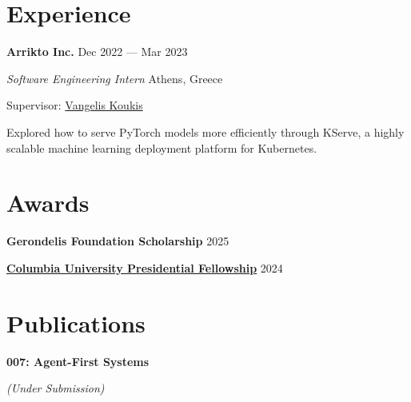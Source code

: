 \documentclass[margin,12pt]{resume}
\newcommand{\cvName}{Nikos Pagonas}
\newcommand{\descriptionVSpace}{\vspace{0.5ex}\xspace}
\newcommand{\subsectionVSpace}{\vspace{3.5ex}\xspace}
\newcommand{\sectionVSpace}{\vspace{1ex}\xspace} %
\newcommand{\sectionVSpaceCorrection}{\vspace{-3.5ex}} %
\newcommand{\header}[1]{\textbf{#1}\xspace}
\newcommand{\authors}[1]{#1\xspace}
\newcommand{\company}[1]{\header{#1}\xspace}
\newcommand{\equalContributionNote}{(*equal contribution)\xspace}
\newcommand{\fellowship}[1]{\header{#1}\xspace}
\newcommand{\interval}[2]{#1 --- #2\xspace}
\newcommand{\me}{\textbf{\cvName}\xspace}
\newcommand{\ordinal}[1]{\textsuperscript{#1}\xspace}
\newcommand{\paperTitle}[1]{\header{#1}\xspace}
\newcommand{\place}[1]{#1\xspace}
\newcommand{\role}[1]{\textit{#1}\xspace}
\newcommand{\stitle}[1]{#1:\xspace}
\newcommand{\underSubmission}{\textit{(Under Submission)}\xspace}
\newcommand{\venue}[1]{\textit{#1}\xspace}
\newenvironment{rSubsection}{}{\par\subsectionVSpace}
\newenvironment{rSection}[1]{\sectionVSpaceCorrection\section{#1}\xspace}{\sectionVSpace\par}
\newenvironment{jobDuties}{\descriptionVSpace}{\par}
\begin{document}
\begin{resume}
\begin{rSection}{Experience}

        \begin{rSubsection}
            \company{Arrikto Inc.} \hfill \interval{Dec 2022}{Mar 2023}

            \role{Software Engineering Intern} \hfill \place{Athens, Greece}

            \stitle{Supervisor} \href{https://www.linkedin.com/in/vkoukis/}{Vangelis Koukis}

            \begin{jobDuties}
                Explored how to serve PyTorch models more efficiently through KServe, a highly scalable machine learning deployment platform for Kubernetes.
            \end{jobDuties}
        \end{rSubsection}
    \end{rSection}


    \begin{rSection}{Awards}
        \begin{rSubsection}
            \fellowship{Gerondelis Foundation Scholarship} \hfill 2025
        \end{rSubsection}

        \begin{rSubsection}
            \fellowship{\href{https://www.cs.columbia.edu/2024/meet-the-scholars-phd-students-with-prestigious-fellowships/}{Columbia University Presidential Fellowship}} \hfill 2024
        \end{rSubsection}
    \end{rSection}

    \begin{rSection}{Publications}
        \begin{rSubsection}
            \paperTitle{007: Agent-First Systems}

            \underSubmission


        \end{rSubsection}


\end{rSection}
\end{resume}
\end{document}
